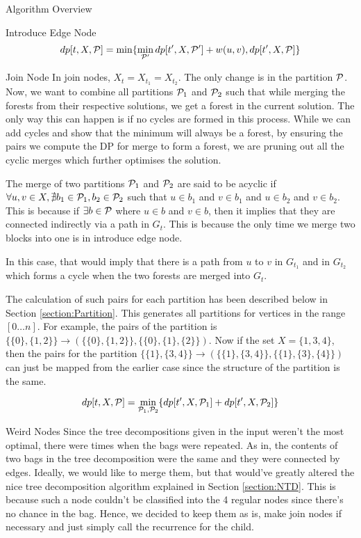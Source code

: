 \begin{section}{Algorithm Overview}
\begin{subsection}{Introduce Edge Node}
		$$dp[t, X, \mathcal{P}] = \min\{\min\limits_{\mathcal{P}'}dp[t', X, \mathcal{P}'] + w(u, v), dp[t', X, \mathcal{P}]\} $$
	\end{subsection}

	\begin{subsection}{Join Node}
		In join nodes, $X_t = X_{t_1} = X_{t_2}$. The only change is in the partition $\mathcal{P}$. Now, we want to combine all partitions $\mathcal{P}_1$ and $\mathcal{P}_2$ such that while merging the forests from their respective solutions, we get a forest in the current solution. The only way this can happen is if no cycles are formed in this process. While we can add cycles and show that the minimum will always be a forest, by ensuring the pairs we compute the DP for merge to form a forest, we are pruning out all the cyclic merges which further optimises the solution. 
		
		The merge of two partitions $\mathcal{P}_1$ and $\mathcal{P}_2$ are said to be acyclic if $\forall u, v \in X, \nexists b_1 \in \mathcal{P}_1, b_2 \in \mathcal{P}_2$ such that $u \in b_1$ and $v \in b_1$ and $u \in b_2$ and $v \in b_2$. This is because if $\exists b \in \mathcal{P}$ where $u \in b$ and $v \in b$, then it implies that they are connected indirectly via a path in $G_t$. This is because the only time we merge two blocks into one is in introduce edge node. 
		
		In this case, that would imply that there is a path from $u$ to $v$ in $G_{t_1}$ and in $G_{t_2}$ which forms a cycle when the two forests are merged into $G_t$. 
		
		The calculation of such pairs for each partition has been described below in Section \ref{section:Partition}. This generates all partitions for vertices in the range $[0 \dots n]$. For example, the pairs of the partition is $\{\{0\}, \{1, 2\}\} \rightarrow (\{\{0\}, \{1, 2\}\}, \{\{0\}, \{1\}, \{2\}\})$. Now if the set $X = \{1, 3, 4\}$, then the pairs for the partition $\{\{1\}, \{3, 4\}\} \rightarrow  (\{\{1\}, \{3, 4\}\}, \{\{1\}, \{3\}, \{4\}\})$ can just be mapped from the earlier case since the structure of the partition is the same. 
		
		$$dp[t, X, \mathcal{P}] = \min\limits_{\mathcal{P}_1, \mathcal{P}_2} \{dp[t', X, \mathcal{P}_1] + dp[t', X, \mathcal{P}_2] \}$$
	\end{subsection}

	\begin{subsection}{Weird Nodes}
		Since the tree decompositions given in the input weren't the most optimal, there were times when the bags were repeated. As in, the contents of two bags in the tree decomposition were the same and they were connected by edges. Ideally, we would like to merge them, but that would've greatly altered the nice tree decomposition algorithm explained in Section \ref*{section:NTD}. This is because such a node couldn't be classified into the 4 regular nodes since there's no chance in the bag. Hence, we decided to keep them as is, make join nodes if necessary and just simply call the recurrence for the child. 
		

\end{subsection}
\end{section}
